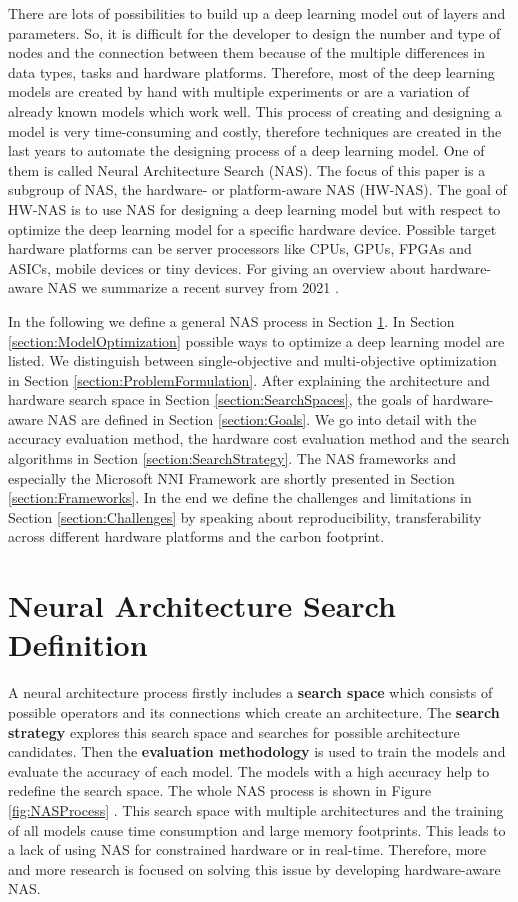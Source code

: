 \documentclass[conference]{IEEEtran}
\begin{document}
There are lots of possibilities to build up a deep learning model out of layers and parameters. So, it is difficult for the developer to design the number and type of nodes and the connection between them because of the multiple differences in data types, tasks and hardware platforms. Therefore, most of the deep learning models are created by hand with multiple experiments or are a variation of already known models which work well. This process of creating and designing a model is very time-consuming and costly, therefore techniques are created in the last years to automate the designing process of a deep learning model. One of them is called Neural Architecture Search (NAS). The focus of this paper is a subgroup of NAS, the hardware- or platform-aware NAS (HW-NAS). The goal of HW-NAS is to use NAS for designing a deep learning model but with respect to optimize the deep learning model for a specific hardware device. Possible target hardware platforms can be server processors like CPUs, GPUs, FPGAs and ASICs, mobile devices or tiny devices. For giving an overview about hardware-aware NAS we summarize a recent survey from 2021 \cite{bib1}. 

In the following we define a general NAS process in Section \ref{section:NASDefinition}. In Section \ref{section:ModelOptimization} possible ways to optimize a deep learning model are listed. We distinguish between single-objective and multi-objective optimization in Section \ref{section:ProblemFormulation}. After explaining the architecture and hardware search space in Section \ref{section:SearchSpaces}, the goals of hardware-aware NAS are defined in Section \ref{section:Goals}. We go into detail with the accuracy evaluation method, the hardware cost evaluation method and the search algorithms in Section \ref{section:SearchStrategy}. The NAS frameworks and especially the Microsoft NNI Framework are shortly presented in Section \ref{section:Frameworks}. In the end we define the challenges and limitations in Section \ref{section:Challenges} by speaking about reproducibility, transferability across different hardware platforms and the carbon footprint.  

\section{Neural Architecture Search Definition}
\label{section:NASDefinition}
A neural architecture process firstly includes a \textbf{search space} which consists of possible operators and its connections which create an architecture. The \textbf{search strategy} explores this search space and searches for possible architecture candidates. Then the \textbf{evaluation methodology} is used to train the models and evaluate the accuracy of each model. The models with a high accuracy help to redefine the search space. The whole NAS process is shown in Figure \ref{fig:NASProcess} \cite{bib1}. This search space with multiple architectures and the training of all models cause time consumption and large memory footprints. This leads to a lack of using NAS for constrained hardware or in real-time. Therefore, more and more research is focused on solving this issue by developing hardware-aware NAS. 
\end{document}
